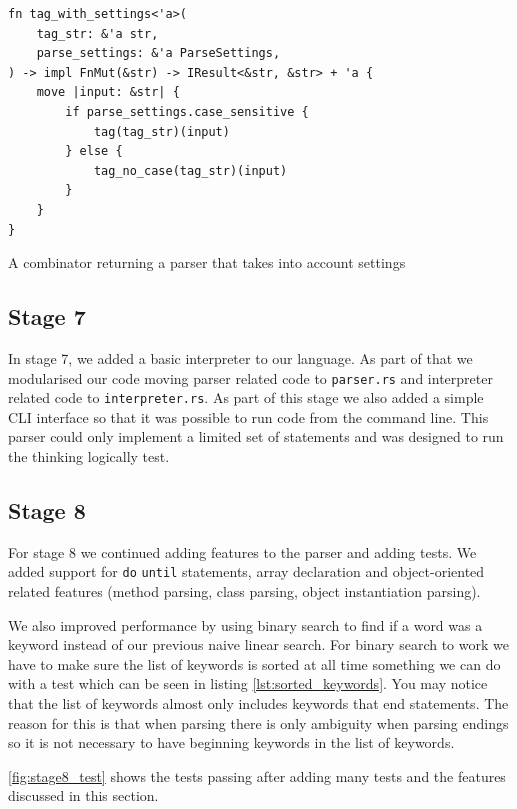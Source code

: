 \documentclass{article}
\begin{document}
\begin{listing}
	\begin{verbatim}
fn tag_with_settings<'a>(
    tag_str: &'a str,
    parse_settings: &'a ParseSettings,
) -> impl FnMut(&str) -> IResult<&str, &str> + 'a {
    move |input: &str| {
        if parse_settings.case_sensitive {
            tag(tag_str)(input)
        } else {
            tag_no_case(tag_str)(input)
        }
    }
}
	\end{verbatim}
	\caption{A combinator returning a parser that takes into account settings}
	\label{lst:tag_with_settings}
\end{listing}

\subsection{Stage 7}

In stage 7, we added a basic interpreter to our language. As part of that we
modularised our code moving parser related code to \texttt{parser.rs} and
interpreter related code to \texttt{interpreter.rs}. As part of this stage we
also added a simple CLI interface so that it was possible to run code from the
command line. This parser could only implement a limited set of statements and
was designed to run the thinking logically test.

\subsection{Stage 8}

For stage 8 we continued adding features to the parser and adding tests. We
added support for \texttt{do} \texttt{until} statements, array declaration and
object-oriented related features (method parsing, class parsing, object
instantiation parsing).

We also improved performance by using binary search to find if a word was a
keyword instead of our previous naive linear search. For binary search to work
we have to make sure the list of keywords is sorted at all time something we
can do with a test which can be seen in listing \ref{lst:sorted_keywords}. You
may notice that the list of keywords almost only includes keywords that end
statements. The reason for this is that when parsing there is only ambiguity
when parsing endings so it is not necessary to have beginning keywords in the
list of keywords.

\autoref{fig:stage8_test} shows the tests passing after adding many tests and
the features discussed in this section.
\end{document}
